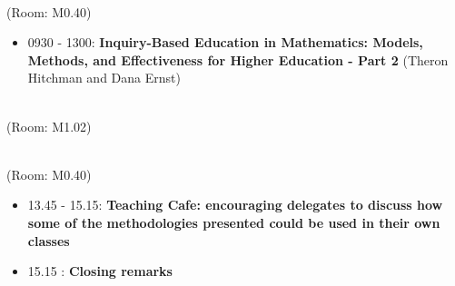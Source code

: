 \documentclass{article}
\begin{document}
\begin{center}
    \\
    \tiny{(Room: M0.40)}
\end{center}

\begin{itemize}
    \item 0930 - 1300: \textbf{Inquiry-Based Education in Mathematics: Models, Methods, and Effectiveness for Higher Education - Part 2} (Theron Hitchman and Dana Ernst)
\end{itemize}

\vspace{1cm}

\begin{center}
    \\
    \tiny{(Room: M1.02)}
\end{center}

\vspace{1cm}

\begin{center}
    \\
    \tiny{(Room: M0.40)}
\end{center}

\begin{itemize}
    \item 13.45 - 15.15: \textbf{Teaching Cafe: encouraging delegates to discuss how some of the methodologies presented could be used in their own classes}
    \item 15.15 : \textbf{Closing remarks}
\end{itemize}
\end{document}
